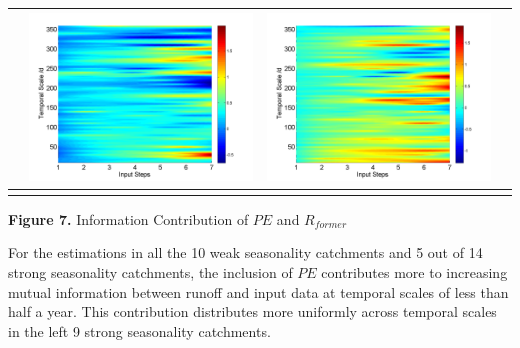 \documentclass[draft,wrr]{AGUTeX}
\begin{document}
\begin{article}
\begin{table}[H]
\begin{tabular}{cccc}
&\begin{minipage}{.3\textwidth}\includegraphics[width=\linewidth]{resultgraph/06810000diff_ep.png}\end{minipage}
&\begin{minipage}{.3\textwidth}\includegraphics[width=\linewidth]{resultgraph/06810000diff_q.png}\end{minipage}
\\
\hline
\\
\end{tabular}
\Large{\textbf{Figure 7.} Information Contribution of $PE$ and $R_{former}$ }
\end{table}

For the estimations in all the 10 weak seasonality catchments and 5 out of 14 strong seasonality catchments, the inclusion of $PE$  contributes more to increasing mutual information between runoff and input data at temporal scales of less than half a year. This contribution distributes more uniformly across temporal scales in the left 9 strong seasonality catchments. 


\end{article}
\end{document}
